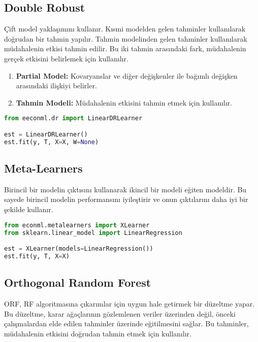 \subsection{Double Robust}
Çift model yaklaşımını kullanır. Kısmi modelden gelen tahminler kullanılarak doğrudan bir tahmin yapılır. Tahmin modelinden gelen tahminler kullanılarak müdahalenin etkisi tahmin edilir. Bu iki tahmin arasındaki fark, müdahalenin gerçek etkisini belirlemek için kullanılır.

\begin{enumerate}
    \item \textbf{Partial Model:} Kovaryanslar ve diğer değişkenler ile bağımlı değişken arasındaki ilişkiyi belirler.
    \item \textbf{Tahmin Modeli:} Müdahalenin etkisini tahmin etmek için kullanılır.
\end{enumerate}

\begin{lstlisting}[language=Python, caption=econml'de Double Robust örneği.]
from eeconml.dr import LinearDRLearner

est = LinearDRLearner()
est.fit(y, T, X=X, W=None)
\end{lstlisting}

\subsection{Meta-Learners}
Birincil bir modelin çıktısını kullanarak ikincil bir modeli eğiten modeldir. Bu sayede birincil modelin performansını iyileştirir ve onun çıktılarını daha iyi bir şekilde kullanır.

\begin{lstlisting}[language=Python, caption=econml'de Meta-Learner örneği.]
from econml.metalearners import XLearner
from sklearn.linear_model import LinearRegression

est = XLearner(models=LinearRegression())
est.fit(y, T, X=X)
\end{lstlisting}

\subsection{Orthogonal Random Forest}
ORF, RF algoritmasına çıkarımlar için uygun hale getirmek bir düzeltme yapar. Bu düzeltme, karar ağaçlarının gözlemlenen veriler üzerinden değil, önceki çalışmalardan elde edilen tahminler üzerinde eğitilmesini sağlar. Bu tahminler, müdahalenin etkisini doğrudan tahmin etmek için kullanılır.

\newpage